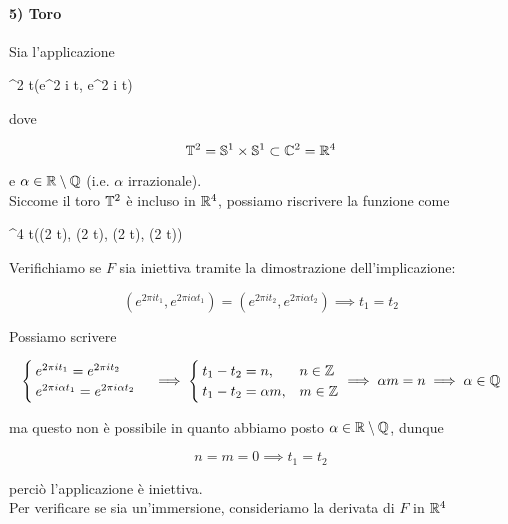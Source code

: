 \paragraph{5) Toro}\label{example:embed-torus}

Sia l'applicazione

	{\R}{\T^{2}}
	{t}{(e^{2 \pi i t}, e^{2 \pi i \alpha t})}

dove

\begin{equation}
	\mathbb{T}^{2} = \mathbb{S}^{1} \times \mathbb{S}^{1} \subset \mathbb{C}^{2} = \mathbb{R}^{4}
\end{equation}

e $ \alpha \in \mathbb{R} \setminus \mathbb{Q} $ (i.e. $ \alpha $ irrazionale). \\
Siccome il toro $ \mathbb{T}^{2} $ è incluso in $ \mathbb{R}^{4} $, possiamo riscrivere la funzione come

	{\R}{\R^{4}}
	{t}{(\cos(2 \pi t), \sin(2 \pi t), \cos(2 \pi \alpha t), \sin(2 \pi \alpha t))}

Verifichiamo se $ F $ sia iniettiva tramite la dimostrazione dell'implicazione:

\begin{equation}
	(e^{2 \pi i t_{1}}, e^{2 \pi i \alpha t_{1}}) = (e^{2 \pi i t_{2}}, e^{2 \pi i \alpha t_{2}}) %
	\implies %
	t_{1} = t_{2}
\end{equation}

Possiamo scrivere

\begin{equation}
	\begin{cases}
		e^{2 \pi i t_{1}} = e^{2 \pi i t_{2}} \\
		e^{2 \pi i \alpha t_{1}} = e^{2 \pi i \alpha t_{2}}
	\end{cases} %
	\implies %
	\begin{cases}
		t_{1} - t_{2} = n, & n \in \Z \\
		t_{1} - t_{2} = \alpha m, & m \in \Z
	\end{cases} %
	\implies %
	\alpha m = n %
	\implies %
	\alpha \in \Q
\end{equation}

ma questo non è possibile in quanto abbiamo posto $ \alpha \in \mathbb{R} \setminus \mathbb{Q} $, dunque

\begin{equation}
	n = m = 0 \implies t_{1} = t_{2}
\end{equation}

perciò l'applicazione è iniettiva. \\
Per verificare se sia un'immersione, consideriamo la derivata di $ F $ in $ \mathbb{R}^{4} $

